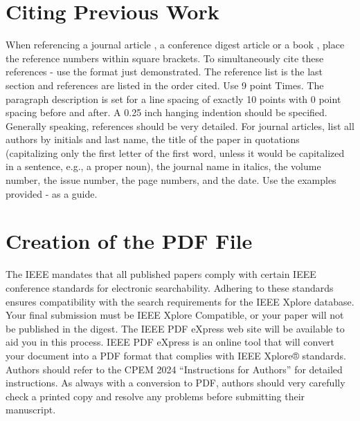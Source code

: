 \documentclass[]{IEEEtran}
\begin{document}
\section{Citing Previous Work}
When referencing a journal article \cite{Bierzychudek}, a conference
digest article \cite{Jarret} or a book \cite{krauss}, place the reference numbers within square
brackets. To simultaneously cite these references \cite{Bierzychudek} - \cite{krauss} use the format just demonstrated. The reference list is the last section and references are listed in the order cited. Use 9 point Times. The paragraph description is set for a line spacing of exactly 10 points with 0 point spacing before and after. A 0.25 inch hanging indention should be specified. 
Generally speaking, references should be very detailed. For journal
articles, list all authors by initials and last name, the title of the
paper in quotations (capitalizing only the first letter of the first
word, unless it would be capitalized in a sentence, e.g., a proper
noun), the journal name in italics, the volume number, the issue
number, the page numbers, and the date. Use the examples provided
\cite{Bierzychudek} - \cite{krauss} as a guide. 


\section{Creation of the PDF File}
The IEEE mandates that all published papers comply with certain IEEE conference standards for electronic searchability. Adhering to these standards ensures compatibility with the search requirements for the IEEE Xplore database.
Your final submission must be IEEE Xplore Compatible, or your paper will not be published in the digest. The IEEE PDF eXpress web site will be available to aid you in this process. IEEE PDF eXpress is an online tool that will convert your document into a PDF format that complies with IEEE Xplore® standards. Authors should refer to the CPEM 2024 ``Instructions for Authors'' for detailed instructions.  As always with a conversion to PDF, authors should very carefully check a printed copy and resolve any problems before submitting their manuscript.
\end{document}
